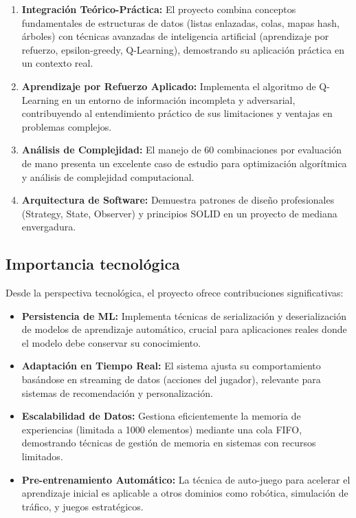 \documentclass[12pt,a4paper]{article}
\begin{document}
\begin{enumerate}
    \item \textbf{Integración Teórico-Práctica:} El proyecto combina conceptos fundamentales de estructuras de datos (listas enlazadas, colas, mapas hash, árboles) con técnicas avanzadas de inteligencia artificial (aprendizaje por refuerzo, epsilon-greedy, Q-Learning), demostrando su aplicación práctica en un contexto real.
    
    \item \textbf{Aprendizaje por Refuerzo Aplicado:} Implementa el algoritmo de Q-Learning en un entorno de información incompleta y adversarial, contribuyendo al entendimiento práctico de sus limitaciones y ventajas en problemas complejos.
    
    \item \textbf{Análisis de Complejidad:} El manejo de 60 combinaciones por evaluación de mano presenta un excelente caso de estudio para optimización algorítmica y análisis de complejidad computacional.
    
    \item \textbf{Arquitectura de Software:} Demuestra patrones de diseño profesionales (Strategy, State, Observer) y principios SOLID en un proyecto de mediana envergadura.
\end{enumerate}

\subsection{Importancia tecnológica}

Desde la perspectiva tecnológica, el proyecto ofrece contribuciones significativas:

\begin{itemize}
    \item \textbf{Persistencia de ML:} Implementa técnicas de serialización y deserialización de modelos de aprendizaje automático, crucial para aplicaciones reales donde el modelo debe conservar su conocimiento.
    
    \item \textbf{Adaptación en Tiempo Real:} El sistema ajusta su comportamiento basándose en streaming de datos (acciones del jugador), relevante para sistemas de recomendación y personalización.
    
    \item \textbf{Escalabilidad de Datos:} Gestiona eficientemente la memoria de experiencias (limitada a 1000 elementos) mediante una cola FIFO, demostrando técnicas de gestión de memoria en sistemas con recursos limitados.
    
    \item \textbf{Pre-entrenamiento Automático:} La técnica de auto-juego para acelerar el aprendizaje inicial es aplicable a otros dominios como robótica, simulación de tráfico, y juegos estratégicos.
\end{itemize}
\end{document}
